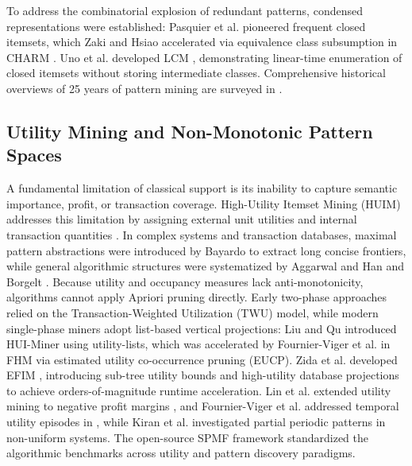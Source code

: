 \documentclass[runningheads,orivec]{llncs}
\begin{document}
To address the combinatorial explosion of redundant patterns, condensed representations were established: Pasquier et al. \cite{pasquier1999discovering} pioneered frequent closed itemsets, which Zaki and Hsiao accelerated via equivalence class subsumption in CHARM \cite{zaki2002charm}. Uno et al. developed LCM \cite{uno2004lcm}, demonstrating linear-time enumeration of closed itemsets without storing intermediate classes. Comprehensive historical overviews of 25 years of pattern mining are surveyed in \cite{luna2019review,fournier2017survey}.

\subsection{Utility Mining and Non-Monotonic Pattern Spaces}
A fundamental limitation of classical support is its inability to capture semantic importance, profit, or transaction coverage. High-Utility Itemset Mining (HUIM) addresses this limitation by assigning external unit utilities and internal transaction quantities \cite{fournier2019survey,gan2021survey}. In complex systems and transaction databases, maximal pattern abstractions were introduced by Bayardo \cite{bayardo1998efficiently} to extract long concise frontiers, while general algorithmic structures were systematized by Aggarwal and Han \cite{aggarwal2014frequent} and Borgelt \cite{borgelt2005implementation}. Because utility and occupancy measures lack anti-monotonicity, algorithms cannot apply Apriori pruning directly. Early two-phase approaches relied on the Transaction-Weighted Utilization (TWU) model, while modern single-phase miners adopt list-based vertical projections: Liu and Qu introduced HUI-Miner \cite{liu2012mining} using utility-lists, which was accelerated by Fournier-Viger et al. in FHM \cite{fournier2014fhm} via estimated utility co-occurrence pruning (EUCP). Zida et al. developed EFIM \cite{zida2017efim}, introducing sub-tree utility bounds and high-utility database projections to achieve orders-of-magnitude runtime acceleration. Lin et al. extended utility mining to negative profit margins \cite{lin2016fhn}, and Fournier-Viger et al. addressed temporal utility episodes in \cite{fournier2016efficient}, while Kiran et al. \cite{kiran2017discovering} investigated partial periodic patterns in non-uniform systems. The open-source SPMF framework \cite{fournier2014spmf} standardized the algorithmic benchmarks across utility and pattern discovery paradigms.
\end{document}
